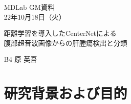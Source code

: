 \documentclass[a4j]{ujarticle}
\begin{document}
    \begin{flushright}
        MDLab GM資料\\
        22年10月18日（火）
    \end{flushright}

    \begin{center}
        {\Large	距離学習を導入したCenterNetによる\\腹部超音波画像からの肝腫瘍検出と分類}
    \end{center}

    \begin{flushright}
        {\large B4 原 英吾}\\
    \end{flushright}

    \section{研究背景および目的}
\end{document}
